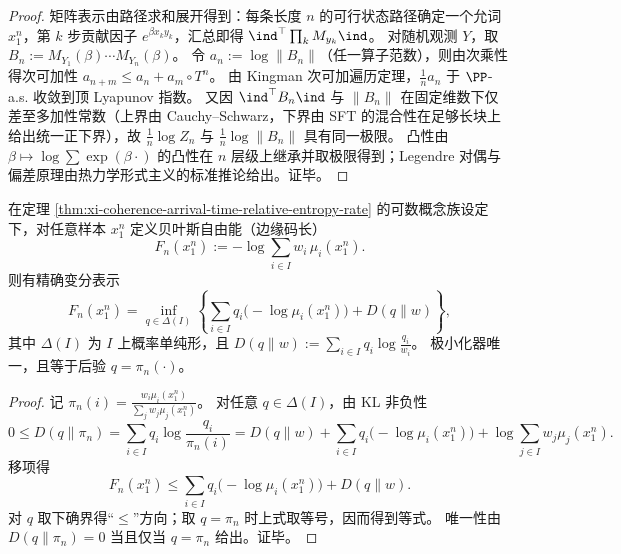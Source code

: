 \begin{proof}
矩阵表示由路径求和展开得到：每条长度 \(n\) 的可行状态路径确定一个允词 \(x_1^n\)，第 \(k\) 步贡献因子 \(e^{\beta x_k y_k}\)，汇总即得 \(\ind^\top\prod_k M_{y_k}\ind\)。
对随机观测 \(Y\)，取 \(B_n:=M_{Y_1}(\beta)\cdots M_{Y_n}(\beta)\)。
令 \(a_n:=\log\|B_n\|\)（任一算子范数），则由次乘性得次可加性 \(a_{n+m}\le a_n+a_m\circ T^n\)。
由 Kingman 次可加遍历定理，\(\frac1n a_n\) 于 \(\PP\)-a.s. 收敛到顶 Lyapunov 指数。
又因 \(\ind^\top B_n\ind\) 与 \(\|B_n\|\) 在固定维数下仅差至多加性常数（上界由 Cauchy--Schwarz，下界由 SFT 的混合性在足够长块上给出统一正下界），故 \(\frac1n\log Z_n\) 与 \(\frac1n\log\|B_n\|\) 具有同一极限。
凸性由 \(\beta\mapsto \log\sum\exp(\beta\cdot)\) 的凸性在 \(n\) 层级上继承并取极限得到；Legendre 对偶与偏差原理由热力学形式主义的标准推论给出。证毕。
\end{proof}

\begin{theorem}\label{thm:xi-bayesian-free-energy-variational-posterior-minimizer}
在定理 \ref{thm:xi-coherence-arrival-time-relative-entropy-rate} 的可数概念族设定下，对任意样本 \(x_1^n\) 定义贝叶斯自由能（边缘码长）
\[
F_n(x_1^n):=-\log\sum_{i\in I}w_i\,\mu_i(x_1^n).
\]
则有精确变分表示
\[
F_n(x_1^n)
=
\inf_{q\in\Delta(I)}
\left\{
\sum_{i\in I}q_i\bigl(-\log\mu_i(x_1^n)\bigr)
+
D(q\|w)
\right\},
\]
其中 \(\Delta(I)\) 为 \(I\) 上概率单纯形，且
\(
D(q\|w):=\sum_{i\in I}q_i\log\frac{q_i}{w_i}
\)。
极小化器唯一，且等于后验 \(q=\pi_n(\cdot)\)。
\end{theorem}

\begin{proof}
记
\(
\pi_n(i)=\frac{w_i\mu_i(x_1^n)}{\sum_j w_j\mu_j(x_1^n)}
\)。
对任意 \(q\in\Delta(I)\)，由 KL 非负性
\[
0\le D(q\|\pi_n)
=\sum_{i\in I}q_i\log\frac{q_i}{\pi_n(i)}
=D(q\|w)+\sum_{i\in I}q_i\bigl(-\log\mu_i(x_1^n)\bigr)+\log\sum_{j\in I}w_j\mu_j(x_1^n).
\]
移项得
\[
F_n(x_1^n)\le \sum_{i\in I}q_i\bigl(-\log\mu_i(x_1^n)\bigr)+D(q\|w).
\]
对 \(q\) 取下确界得“\(\le\)”方向；取 \(q=\pi_n\) 时上式取等号，因而得到等式。
唯一性由 \(D(q\|\pi_n)=0\) 当且仅当 \(q=\pi_n\) 给出。证毕。
\end{proof}

